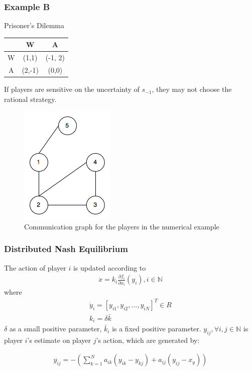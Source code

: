 \documentclass[notheorems, aspectratio=54]{beamer}
\begin{document}
\begin{frame}
  \frametitle{Example B}

  Prisoner's Dilemma
  \begin{center}
    \begin{tabular}{c|c|c|}
      & W & A \\
      \hline
      W & (1,1)&(-1, 2)\\
      \hline
      A & (2,-1)&(0,0)\\
    \end{tabular}
  \end{center}
  If players are sensitive on the uncertainty of $s_{-1}$, they may not choose the rational strategy.
\end{frame}

\begin{frame}
  \begin{figure}[H]
    \centering
    \includegraphics[width=0.3\linewidth]{nodes.png}
    \caption{Communication graph for the players in the numerical example}
  \end{figure}

\end{frame}

\begin{frame}
  \frametitle{Distributed Nash Equilibrium}

  The action of player $i$ is updated according to\newline
  \begin{gather}
    \dot{x} = k_i \frac {\partial f_i}{\partial x_i}(y_i), i \in \mathbb{N} 
  \end{gather}
  where
   \begin{gather}
     \dot{y}_i = [y_{i1}, y_{i2},...,y_{iN}]^T \in R \nonumber \\
     k_i = \delta \bar{k} \nonumber
   \end{gather}
   $\delta$ as a small positive parameter, $\bar{k}_i$ is a fixed positive parameter.\newline
   $y_{ij}, \forall i, j \in \mathbb{N}$ is player $i$'s estimate on player $j$'s action, which are generated by:\newline

   \begin{gather}
     \dot{y_{ij}}=-\left(\sum_{k=1}^N a_{ik}(y_{ik}-y_{kj})+a_{ij}(y_{ij}-x_y)\right) \nonumber
   \end{gather}

\end{frame}
\end{document}
